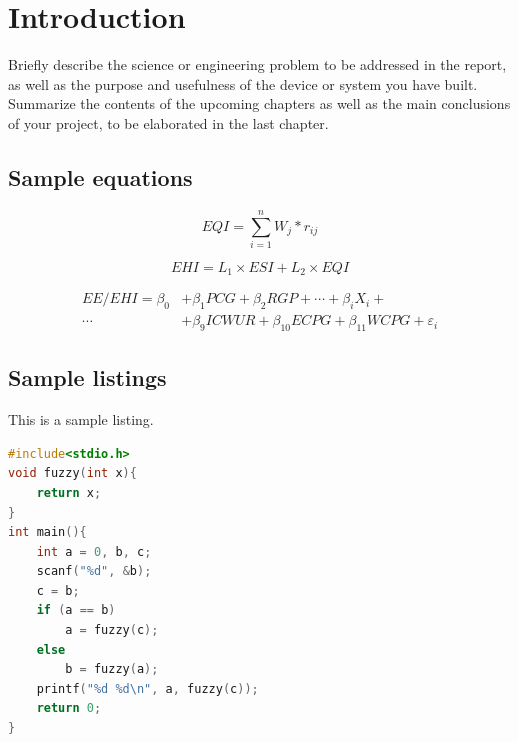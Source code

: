 \documentclass{senior-design}
\begin{document}
\generalreportcover %
\frontmatter
\tableofcontents

\mainmatter
\chapter{Introduction}
Briefly describe the science or engineering problem to be addressed in the report, as well as the purpose and usefulness of the device or system you have built. Summarize the contents of the upcoming chapters as well as the main conclusions of your project, to be elaborated in the last chapter.

\section{Sample equations}
\begin{equation}
    EQI = \sum_{i=1}^{n}W_j * r_{ij}
\end{equation}

\begin{equation}
    EHI = L_1 \times ESI + L_2 \times EQI
\end{equation}

\begin{equation}
    \begin{aligned}
        EE / EHI = \beta_0 & + \beta_1 PCG + \beta_2 RGP + \cdots + \beta_i X_i +              \\
        \cdots             & + \beta_9 ICWUR + \beta_{10} ECPG + \beta_11 WCPG + \varepsilon_i
    \end{aligned}
\end{equation}

\section{Sample listings}
This is a sample listing.
\begin{lstlisting}[language=c]
#include<stdio.h>
void fuzzy(int x){
    return x;
}
int main(){
    int a = 0, b, c;
    scanf("%d", &b);
    c = b;
    if (a == b)
        a = fuzzy(c);
    else
        b = fuzzy(a);
    printf("%d %d\n", a, fuzzy(c));
    return 0;
}
\end{lstlisting}
\end{document}
